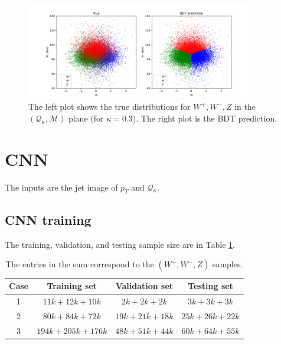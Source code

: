 \documentclass[12pt]{article}
\begin{document}
		\begin{figure}[htpb]
			\centering
			\includegraphics[width=0.9\textwidth]{figures/True_and_BDT_distribution_of_M_Qk.png}
			\caption{The left plot shows the true distributions for $W^{+}, W^{-}, Z$  in the $(\mathcal{Q}_\kappa ,\mathcal{M})$ plane (for $\kappa=0.3$). The right plot is the BDT prediction.}
			\label{fig:M_Qk_distribution}
		\end{figure}

\section{CNN}%
\label{sec:cnn}
	The inputs are the jet image of $p_T$ and $\mathcal{Q}_\kappa$.
	\subsection{CNN training}%
	\label{sub:cnn_training}
		The training, validation, and testing sample size are in Table \ref{tab:CNN_sample_size}.
		\begin{table}[htpb]
			\centering
			\caption{The entries in the sum correspond to the $(W^{+}, W^{-}, Z)$ samples.}
			\label{tab:CNN_sample_size}
			\begin{tabular}{c|c|c|c}
			Case & Training set     & Validation set & Testing set   \\ \hline
			1    & $11k+12k+10k$    & $2k+2k+2k$     & $3k+3k+3k$    \\
			2    & $80k+84k+72k$    & $19k+21k+18k$  & $25k+26k+22k$ \\
			3    & $194k+205k+176k$ & $48k+51k+44k$  & $60k+64k+55k$
			\end{tabular}
		\end{table}
\end{document}
